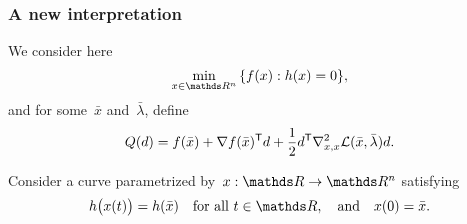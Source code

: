 \documentclass{polyu-presentation}
\newcommand{\lag}{\mathcal{L}}
\newcommand{\obj}{f}
\begin{document}
\begin{frame}
    \frametitle{A new interpretation}

    We consider here
    \begin{equation*}
        \min_{x \in \R^n} \, \set{\obj(x) : h(x) = 0},
    \end{equation*}
    and for some~$\bar{x}$ and~$\bar{\lambda}$, define
    \begin{equation*}
        Q(d) = \obj(\bar{x}) + \nabla \obj(\bar{x})^{\T} d + \frac{1}{2} d^{\T} \nabla_{x, x}^2 \lag(\bar{x}, \bar{\lambda}) d.
    \end{equation*}
    
    \begin{block}{}
        Consider a curve parametrized by~$x : \R \to \R^n$ satisfying
        \begin{equation*}
            h\big(x(t)\big) = h(\bar{x}) \quad \text{for all~$t \in \R$}, \quad \text{and} \quad x(0) = \bar{x}.
        \end{equation*}

        \smallskip

        \begin{center}
        \end{center}
    \end{block}
\end{frame}
\end{document}
